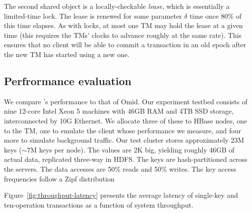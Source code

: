 The second shared object is a locally-checkable \emph{lease}, which is essentially a  limited-time lock.
The lease is renewed for some parameter $\delta$  time once 80\% of this time elapses.
As with locks, at most one TM may hold the lease at a given time (this requires the TMs' clocks to advance roughly at the same rate). 
This ensures that no client will be able to commit a transaction in an old epoch after the new TM has started 
using a new one.


\subsection{Perfrormance evaluation}
\label{ssec:ll-graphs} 

We compare \sysll's performance to that of Omid. 
Our experiment testbed consists of nine 12-core Intel Xeon 5 machines with 46GB RAM and 4TB 
SSD storage, interconnected by 10G Ethernet. We allocate three of these to HBase nodes, 
one to the TM, one to emulate the client whose performance we measure, and four more to simulate 
background traffic.  
Our test cluster stores approximately 23M keys ($\sim\!\!7$M keys per node). 
The values are 2K big, yielding roughly 46GB of actual data, replicated three-way in HDFS. The keys are hash-partitioned
across the servers. The data accesses are 50\% reads and 
50\% writes. The key access frequencies follow a Zipf distribution

Figure~\ref{fig:throughput-latency} presents the average latency of single-key and ten-operation transactions as a function of {system} throughput.




